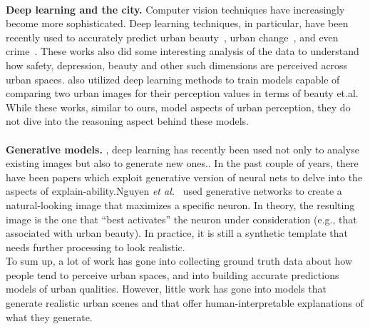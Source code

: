 \mbox{}\\
\noindent
\textbf{Deep learning and the city.} Computer vision techniques have increasingly become more sophisticated. Deep learning techniques, in particular, have been recently used to accurately predict urban beauty~\cite{dubey2016deep,seresinhe2017using}, urban change~\cite{naik2017computer}, and even crime~\cite{DeNadai16,arietta2014city}. These works also did some interesting analysis of the data to understand how safety, depression, beauty and other such dimensions are perceived across urban spaces.  \cite{dubey2016deep} also utilized deep learning methods to train models capable of comparing two urban images for their perception values in terms of beauty et.al.  While these works, similar to ours, model aspects of urban perception, they do not dive into the reasoning aspect behind these models.
\mbox{}\\

\mbox{}\\
\noindent
\textbf{Generative models.} , deep learning has recently been used not only to analyse existing images but also to generate new ones.. In the past couple of years, there have been papers which exploit generative version of neural nets to delve into the aspects of explain-ability.Nguyen \emph{et al.}~\cite{nguyen2016synthesizing} used generative networks to create a natural-looking image that maximizes a specific neuron. In theory, the resulting image is the one that ``best activates'' the neuron under consideration (e.g., that associated with urban beauty). In practice, it is still a synthetic template that needs further processing to look realistic. 
\mbox{}\\

\mbox{}
To sum up, a lot of work has gone into collecting ground truth data about how people tend to perceive urban spaces, and into building accurate predictions models of urban qualities. However,  little work has gone into models that generate realistic urban scenes and that offer human-interpretable explanations of what they generate. 


